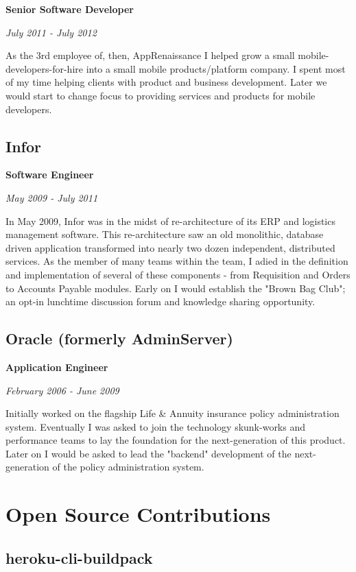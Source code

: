 \documentclass[12pt letterpaper notitlepage]{article}
\begin{document}
\textbf{Senior Software Developer}

\emph{July 2011 - July 2012}

As the 3rd employee of, then, AppRenaissance I helped grow a small
mobile-developers-for-hire into a small mobile products/platform company. I
spent most of my time helping clients with product and business
development. Later we would start to change focus to providing services and
products for mobile developers.

\subsection*{Infor}
\label{sec-2-5}

\textbf{Software Engineer}

\emph{May 2009 - July 2011}

In May 2009, Infor was in the midst of re-architecture of its ERP and logistics
management software. This re-architecture saw an old monolithic, database driven
application transformed into nearly two dozen independent, distributed
services. As the member of many teams within the team, I adied in the definition
and implementation of several of these components - from Requisition and Orders
to Accounts Payable modules. Early on I would establish the "Brown Bag Club"; an
opt-in lunchtime discussion forum and knowledge sharing opportunity.

\subsection*{Oracle (formerly AdminServer)}
\label{sec-2-6}

\textbf{Application Engineer}

\emph{February 2006 - June 2009}

Initially worked on the flagship Life \& Annuity insurance policy administration
system. Eventually I was asked to join the technology skunk-works and
performance teams to lay the foundation for the next-generation of this
product. Later on I would be asked to lead the "backend" development of the
next-generation of the policy administration system.

\section*{Open Source Contributions}
\label{sec-3}

\subsection*{heroku-cli-buildpack}
\label{sec-3-1}
\end{document}
